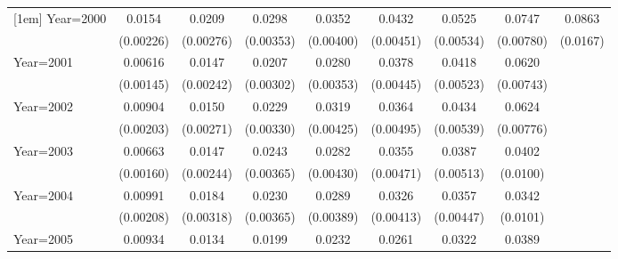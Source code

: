 \begin{table}[htbp]
\begin{tabular}{l*{8}{c}}
[1em]
Year=2000           &      0.0154\sym{***}&      0.0209\sym{***}&      0.0298\sym{***}&      0.0352\sym{***}&      0.0432\sym{***}&      0.0525\sym{***}&      0.0747\sym{***}&      0.0863\sym{***}\\
                    &   (0.00226)         &   (0.00276)         &   (0.00353)         &   (0.00400)         &   (0.00451)         &   (0.00534)         &   (0.00780)         &    (0.0167)         \\
[1em]
Year=2001           &     0.00616\sym{***}&      0.0147\sym{***}&      0.0207\sym{***}&      0.0280\sym{***}&      0.0378\sym{***}&      0.0418\sym{***}&      0.0620\sym{***}&                     \\
                    &   (0.00145)         &   (0.00242)         &   (0.00302)         &   (0.00353)         &   (0.00445)         &   (0.00523)         &   (0.00743)         &                     \\
[1em]
Year=2002           &     0.00904\sym{***}&      0.0150\sym{***}&      0.0229\sym{***}&      0.0319\sym{***}&      0.0364\sym{***}&      0.0434\sym{***}&      0.0624\sym{***}&                     \\
                    &   (0.00203)         &   (0.00271)         &   (0.00330)         &   (0.00425)         &   (0.00495)         &   (0.00539)         &   (0.00776)         &                     \\
[1em]
Year=2003           &     0.00663\sym{***}&      0.0147\sym{***}&      0.0243\sym{***}&      0.0282\sym{***}&      0.0355\sym{***}&      0.0387\sym{***}&      0.0402\sym{***}&                     \\
                    &   (0.00160)         &   (0.00244)         &   (0.00365)         &   (0.00430)         &   (0.00471)         &   (0.00513)         &    (0.0100)         &                     \\
[1em]
Year=2004           &     0.00991\sym{***}&      0.0184\sym{***}&      0.0230\sym{***}&      0.0289\sym{***}&      0.0326\sym{***}&      0.0357\sym{***}&      0.0342\sym{***}&                     \\
                    &   (0.00208)         &   (0.00318)         &   (0.00365)         &   (0.00389)         &   (0.00413)         &   (0.00447)         &    (0.0101)         &                     \\
[1em]
Year=2005           &     0.00934\sym{***}&      0.0134\sym{***}&      0.0199\sym{***}&      0.0232\sym{***}&      0.0261\sym{***}&      0.0322\sym{***}&      0.0389\sym{***}&                     \\

\end{tabular}
\end{table}
